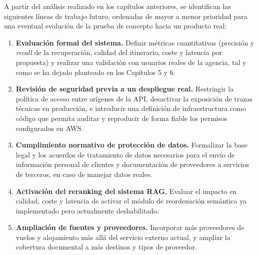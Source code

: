 A partir del análisis realizado en los capítulos anteriores, se identifican las siguientes líneas de trabajo futuro, ordenadas de mayor a menor prioridad para una eventual evolución de la prueba de concepto hacia un producto real:

\begin{enumerate}
\item \textbf{Evaluación formal del sistema.} Definir métricas cuantitativas (precisión y \textit{recall} de la recuperación, calidad del itinerario, coste y latencia por propuesta) y realizar una validación con usuarios reales de la agencia, tal y como se ha dejado planteado en los Capítulos 5 y 6.
\item \textbf{Revisión de seguridad previa a un despliegue real.} Restringir la política de acceso entre orígenes de la API, desactivar la exposición de trazas técnicas en producción, e introducir una definición de infraestructura como código que permita auditar y reproducir de forma fiable los permisos configurados en AWS.
\item \textbf{Cumplimiento normativo de protección de datos.} Formalizar la base legal y los acuerdos de tratamiento de datos necesarios para el envío de información personal de clientes y documentación de proveedores a servicios de terceros, en caso de manejar datos reales.
\item \textbf{Activación del reranking del sistema RAG.} Evaluar el impacto en calidad, coste y latencia de activar el módulo de reordenación semántica ya implementado pero actualmente deshabilitado.
\item \textbf{Ampliación de fuentes y proveedores.} Incorporar más proveedores de vuelos y alojamiento más allá del servicio externo actual, y ampliar la cobertura documental a más destinos y tipos de proveedor.
\end{enumerate}

